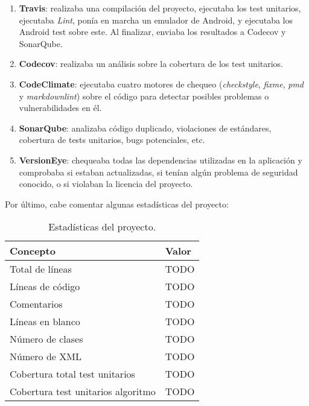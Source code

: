 \begin{enumerate}
\def\labelenumi{\arabic{enumi}.}
\tightlist
\item
  \textbf{Travis}: realizaba una compilación del proyecto, ejecutaba los
  test unitarios, ejecutaba \emph{Lint}, ponía en marcha un emulador de
  Android, y ejecutaba los Android test sobre este. Al finalizar,
  enviaba los resultados a Codecov y SonarQube.
\item
  \textbf{Codecov}: realizaba un análisis sobre la cobertura de los test
  unitarios.
\item
  \textbf{CodeClimate}: ejecutaba cuatro motores de chequeo
  (\emph{checkstyle}, \emph{fixme}, \emph{pmd} y \emph{markdownlint})
  sobre el código para detectar posibles problemas o vulnerabilidades en
  él.
\item
  \textbf{SonarQube}: analizaba código duplicado, violaciones de
  estándares, cobertura de tests unitarios, bugs potenciales, etc.
\item
  \textbf{VersionEye}: chequeaba todas las dependencias utilizadas en la
  aplicación y comprobaba si estaban actualizadas, si tenían algún
  problema de seguridad conocido, o si violaban la licencia del
  proyecto.
\end{enumerate}


Por último, cabe comentar algunas estadísticas del proyecto:

\begin{table}[H]
\centering
\begin{tabular}{lr}
\toprule
\textbf{Concepto}                  & \multicolumn{1}{l}{\textbf{Valor}} \\ 
\midrule
Total de líneas                    & TODO                               \\
Líneas de código                   & TODO                               \\
Comentarios                        & TODO                               \\
Líneas en blanco                   & TODO                               \\
Número de clases                   & TODO                               \\
Número de XML                      & TODO                               \\
Cobertura total test unitarios     & TODO                               \\
Cobertura test unitarios algoritmo & TODO                               \\ 
\bottomrule
\end{tabular}
\caption{Estadísticas del proyecto.}
\label{stats}
\end{table}


